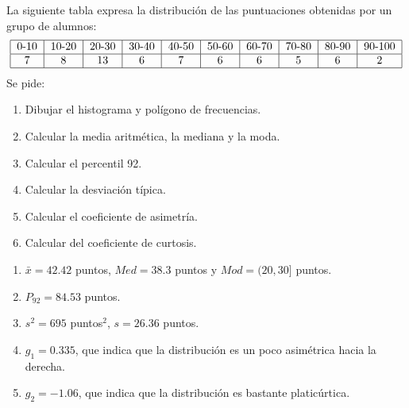 {La siguiente tabla expresa la distribución de las puntuaciones obtenidas por un grupo de alumnos:
\[
\begin{tabular}{|c|c|c|c|c|c|c|c|c|c|}
\hline
0-10 & 10-20 & 20-30 & 30-40 & 40-50 & 50-60 & 60-70 & 70-80 & 80-90 & 90-100
\\ \hline
7 & 8 & 13 & 6 & 7 & 6 & 6 & 5 & 6 & 2 \\ \hline
\end{tabular}
\]
Se pide:
\begin{enumerate}
\item  Dibujar el histograma y polígono de frecuencias.
\item  Calcular la media aritmética, la mediana y la moda.
\item  Calcular el percentil 92.
\item  Calcular la desviación típica.
\item  Calcular el coeficiente de asimetría.
\item  Calcular del coeficiente de curtosis.
\end{enumerate}
}
{
\begin{enumerate}[start=2]
\item $ \bar{x} = 42.42$ puntos, $Med =38.3$ puntos y $Mod= (20,30]$ puntos.
\item $P_{92}=84.53$ puntos.
\item $s^2 = 695$ puntos$^2$, $s= 26.36$ puntos.
\item $g_1 = 0.335$, que indica que la distribución es un poco asimétrica hacia la derecha.
\item $g_2 = -1.06$, que indica que la distribución es bastante platicúrtica.
\end{enumerate}
}
{}


